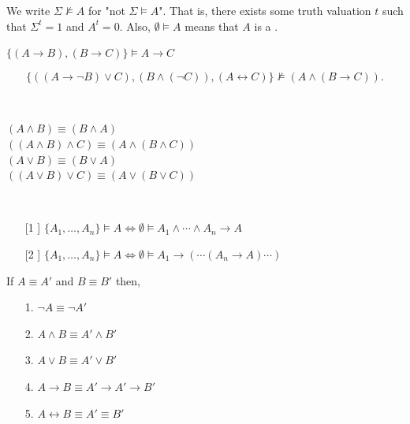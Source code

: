 \documentclass[english, 11pt]{article}
\begin{document}
  We write $\Sigma \not \models A$ for "not $\Sigma \models A$". That is, there exists some truth valuation $t$ such that $\Sigma^t = 1$ and $A^t = 0$. Also, $\emptyset \models A$ means that $A$ is a .

  \begin{exmp}
    $\{(A \rightarrow B), (B \rightarrow C)\} \models A \rightarrow C$
  \end{exmp}

  \begin{exmp}
    \[ \{((A \rightarrow \neg B ) \lor C), (B \land (\neg C)),(A\leftrightarrow C)\} \not \models (A \land (B \rightarrow C)). \]
  \end{exmp}

  \begin{defn}\label{assoccommut} \
    \begin{center}
      $(A \land B) \equiv (B \land A)$ \\
      $((A \land B) \land C) \equiv (A \land (B \land C))$ \\
      $(A \lor B) \equiv (B \lor A)$ \\
      $((A \lor B) \lor C) \equiv (A \lor (B \lor C))$
    \end{center}
  \end{defn}

  \begin{thrm} \
    \begin{itemize}
      \item[[1]] $\{A_1,\ldots,A_n\} \models A \iff \emptyset \models A_1 \land \cdots \land A_n \rightarrow A$
      \item[[2]] $\{A_1,\ldots,A_n\} \models A \iff \emptyset \models A_1 \rightarrow (\cdots (A_n \rightarrow A) \cdots)$
    \end{itemize}
  \end{thrm}

  \begin{lem}
    If $A \equiv A'$ and $B \equiv B'$ then,
    \begin{itemize}
      \item[1.] $\neg A \equiv \neg A'$
      \item[2.] $A \land B \equiv A' \land B'$
      \item[3.] $A \lor B \equiv A' \lor B'$
      \item[4.] $A \rightarrow B \equiv A' \rightarrow A' \rightarrow B'$
      \item[5.] $A \leftrightarrow B \equiv A' \equiv B'$
    \end{itemize}
  \end{lem}
\end{document}
